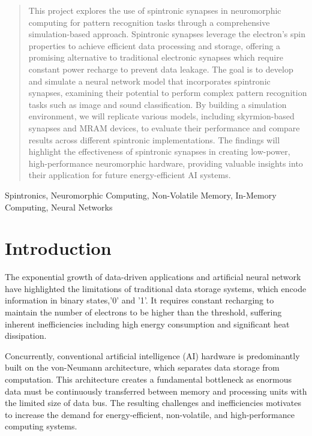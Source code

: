 \documentclass[conference]{IEEEtran}
\begin{document}
\begin{abstract}
 This project explores the use of spintronic synapses in neuromorphic computing for pattern recognition tasks through a comprehensive simulation-based approach. Spintronic synapses leverage the electron's spin properties to achieve efficient data processing and storage, offering a promising alternative to traditional electronic synapses which require constant power recharge to prevent data leakage. The goal is to develop and simulate a neural network model that incorporates spintronic synapses, examining their potential to perform complex pattern recognition tasks such as image and sound classification. By building a simulation environment, we will replicate various models, including skyrmion-based synapses and MRAM devices, to evaluate their performance and compare results across different spintronic implementations. The findings will highlight the effectiveness of spintronic synapses in creating low-power, high-performance neuromorphic hardware, providing valuable insights into their application for future energy-efficient AI systems.  
\end{abstract}

\begin{IEEEkeywords}
Spintronics, Neuromorphic Computing, Non-Volatile Memory, In-Memory Computing, Neural Networks
\end{IEEEkeywords}

\section{Introduction}
The exponential growth of data-driven applications and artificial neural network have highlighted the limitations of traditional data storage systems, which encode information in binary states,'0' and '1'. It requires constant recharging to maintain the number of electrons to be higher than the threshold, suffering inherent inefficiencies including high energy consumption and significant heat dissipation.

Concurrently, conventional artificial intelligence (AI) hardware is predominantly built on the von-Neumann architecture, which separates data storage from computation. This architecture creates a fundamental bottleneck as enormous data must be continuously transferred between memory and processing units with the limited size of data bus. The resulting challenges and inefficiencies motivates to increase the demand for energy-efficient, non-volatile, and high-performance computing systems.
\end{document}
